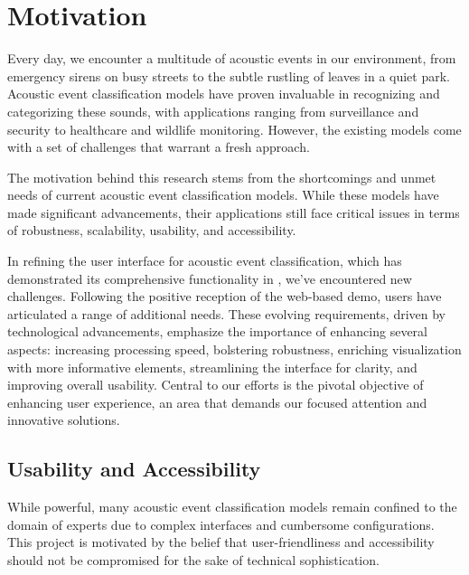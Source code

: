 \section{Motivation}


Every day, we encounter a multitude of acoustic events in our environment, from emergency sirens on busy streets to the subtle rustling of leaves in a quiet park. Acoustic event classification models have proven invaluable in recognizing and categorizing these sounds, with applications ranging from surveillance and security to healthcare and wildlife monitoring. However, the existing models come with a set of challenges that warrant a fresh approach.

The motivation behind this research stems from the shortcomings and unmet needs of current acoustic event classification models. While these models have made significant advancements, their applications still face critical issues in terms of robustness, scalability, usability, and accessibility.

In refining the user interface for acoustic event classification, which has demonstrated its comprehensive functionality in \cite{sampath2019realtime}, we've encountered new challenges. Following the positive reception of the web-based demo, users have articulated a range of additional needs. These evolving requirements, driven by technological advancements, emphasize the importance of enhancing several aspects: increasing processing speed, bolstering robustness, enriching visualization with more informative elements, streamlining the interface for clarity, and improving overall usability. Central to our efforts is the pivotal objective of enhancing user experience, an area that demands our focused attention and innovative solutions.


\subsection{Usability and Accessibility}
While powerful, many acoustic event classification models remain confined to the domain of experts due to complex interfaces and cumbersome configurations. This project is motivated by the belief that user-friendliness and accessibility should not be compromised for the sake of technical sophistication.

